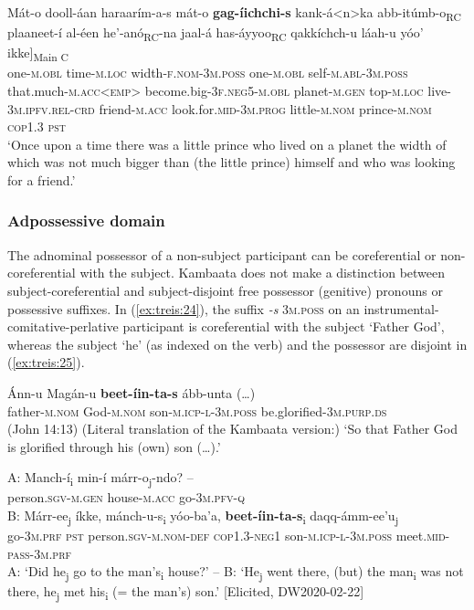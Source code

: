 \documentclass[output=paper]{langscibook}
\begin{document}
\ea\label{ex:treis:23} 
\gll {\ob}Mát-o dooll-áan {\ob}{\ob}haraarím-a-s mát-o \textbf{gag-íichchi-s} kank-á<n>ka abb-itúmb-o{\cb}\textup{\textsubscript{RC}} plaaneet-í al-éen he’-anó{\cb}\textup{\textsubscript{RC}}-na {\ob}jaal-á has-áyyoo{\cb}\textup{\textsubscript{RC}} qakkíchch-u láah-u yóo’ ikke]\textup{\textsubscript{Main C}}\\
     {\db}one-\textsc{m.obl} time-\textsc{m.loc} {\db}{\db}width-\textsc{f.nom-3m.poss} one-\textsc{m.obl} self-\textsc{m.abl-3m.poss} that.much-\textsc{m.acc<emp>} become.big-\textsc{3f.neg5-m.obl} planet-\textsc{m.gen} top-\textsc{m.loc} live-\textsc{3m.ipfv.rel-crd} {\db}friend-\textsc{m.acc} look.for.\textsc{mid-3m.prog} little-\textsc{m.nom} prince-\textsc{m.nom} \textsc{cop1.3} \textsc{pst}\\
\glt ‘Once upon a time there was a little prince who lived on a planet the width of which was not much bigger than (the little prince) himself and who was looking for a friend.’ \citep[20]{Saint-Exupéry2018}\z

\subsubsection{Adpossessive domain}\label{sec:treis:3.2.4}

The adnominal possessor of a non-subject participant can be coreferential or non-coreferential with the subject. Kambaata does not make a distinction between subject-coreferential and subject-disjoint free possessor (genitive) pronouns or possessive suffixes. In (\ref{ex:treis:24}), the suffix \textit{-s} \textsc{3m.poss} on an instrumental-comitative-perlative participant is coreferential with the subject ‘Father God’, whereas the subject ‘he’ (as indexed on the verb) and the possessor are disjoint in (\ref{ex:treis:25}).

\ea\label{ex:treis:24} 
\gll Ánn-u Magán-u \textbf{beet-íin-ta-s} {ább-unta (…)}\\
     father-\textsc{m.nom} God-\textsc{m.nom} son-\textsc{m.icp-l-3m.poss} be.glorified-\textsc{3m.purp.ds}\\
\glt (John 14:13) (Literal translation of the Kambaata version:) ‘So that Father God is glorified through his (own) son (…).’ \citep[68]{KHTPH2005}\z

\ea\label{ex:treis:25} 
\gll \textup{A:} Manch-í\textup{\textsubscript{i}} min-í márr-o\textup{\textsubscript{j}}-ndo? -- \\
     {} person.\textsc{sgv-m.gen} house-\textsc{m.acc} go-\textsc{3m.pfv-q} {} \\
\gll \textup{B:} Márr-ee\textup{\textsubscript{j}} íkke, mánch-u-s\textup{\textsubscript{i}} yóo-ba’a, \textbf{beet-íin-ta-s}\textup{\textsubscript{i}} daqq-ámm-ee’u\textup{\textsubscript{j}} \\
     {} go-\textsc{3m.prf} \textsc{pst} person.\textsc{sgv-m.nom-def} \textsc{cop1.3-neg1} son-\textsc{m.icp-l-3m.poss} meet.\textsc{mid-pass-3m.prf}\\
\glt A: ‘Did he\textsubscript{j} go to the man’s\textsubscript{i} house?’ – B: ‘He\textsubscript{j} went there, (but) the man\textsubscript{i} was not there, he\textsubscript{j} met his\textsubscript{i} (= the man’s) son.’ [Elicited, DW2020-02-22]\z
\end{document}
